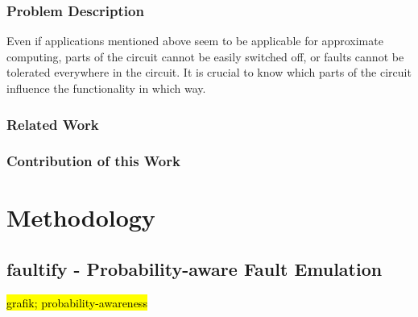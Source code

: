 \documentclass[conference]{IEEEtran}
\begin{document}
\subsubsection*{Problem Description}
Even if applications mentioned above seem to be applicable for approximate computing, parts of the circuit cannot be easily switched off, or faults cannot be tolerated everywhere in the circuit. It is crucial to know which parts of the circuit influence the functionality in which way.
\subsubsection*{Related Work}
\subsubsection*{Contribution of this Work}






\section{Methodology}
\subsection{faultify - Probability-aware Fault Emulation}
\hl{grafik; probability-awareness}
\end{document}
